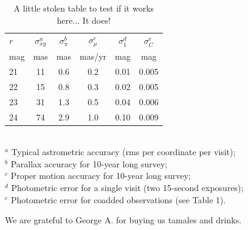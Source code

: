 \documentclass[12pt,preprint]{aastex}
\begin{document}
\begin{table}[t!]
\caption{A little stolen table to test if it works here... It does! }
\vskip 0.05in
\begin{tabular}{|l|c|c|c|c|c|}
\hline  
    $r$   &  $\sigma^a_{xy} $  & $\sigma^b_\pi$  &   $\sigma^c_\mu$   &  $\sigma^d_1$  &  $\sigma^e_C$  \\
    mag &       mas            &      mas  & mas/yr &   mag   &    mag  \\
\hline  
       21 &  11  &  0.6  &  0.2   &   0.01  &   0.005 \\
       22 &  15  &  0.8  &  0.3   &   0.02  &   0.005 \\
       23 &  31  &  1.3  &  0.5   &   0.04  &   0.006 \\
       24 &  74  &  2.9  &  1.0   &   0.10  &   0.009 \\
\hline                         
\end{tabular}
\\ \vskip 0.05in
  $^a$ Typical astrometric accuracy (rms per coordinate per visit); \\
  $^b$ Parallax accuracy for 10-year long survey; \\
  $^c$ Proper motion accuracy for 10-year long survey; \\
  $^d$ Photometric error for a single visit (two 15-second exposures); \\
  $^e$ Photometric error for coadded observations (see Table 1). \\
\end{table}


\acknowledgments
We are grateful to George A. for buying us tamales and drinks. 



\end{document}
